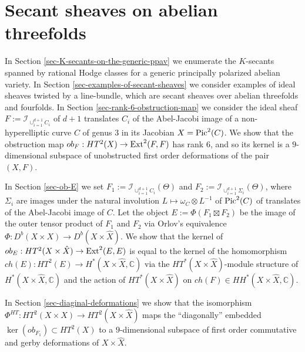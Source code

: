 \documentclass[12pt]{amsart}
\numberwithin{equation}{subsection}
\theoremstyle{plain}
\theoremstyle{definition}
\newcommand{\CC}{{\mathbb C}}
\newcommand{\Pic}{{\rm Pic}}
\newcommand{\Ext}{{\rm Ext}}
\newcommand{\Ideal}[1]{{\mathcal I}_{#1}}
\begin{document}
% 
\section{Secant sheaves on abelian threefolds}
\label{section-secant-sheaves-on-abelian-threefolds}
In Section \ref{sec-K-secants-on-the-generic-ppav} we enumerate the $K$-secants spanned by rational Hodge classes for a generic principally polarized abelian variety.
In Section \ref{sec-examples-of-secant-sheaves} we consider examples of ideal sheaves twisted by a line-bundle, which are secant sheaves over abelian threefolds and fourfolds.
In Section \ref{sec-rank-6-obstruction-map} we consider the ideal sheaf $F:=\Ideal{\cup_{i=1}^{d+1}C_i}$ of $d+1$ translates $C_i$ of the Abel-Jacobi 
image of a non-hyperelliptic curve $C$ of genus $3$ in its Jacobian $X=\Pic^2(C)$. We show that the obstruction map
$ob_F:HT^2(X)\rightarrow \Ext^2(F,F)$ has rank $6$, and so its kernel is a $9$-dimensional subspace of unobstructed first order deformations of the pair $(X,F)$.

In Section \ref{sec-ob-E} we set $F_1:=\Ideal{\cup_{i=1}^{d+1}C_i}(\Theta)$ and $F_2:=\Ideal{\cup_{i=1}^{d+1}\Sigma_i}(\Theta)$,
where $\Sigma_i$ are images under the natural involution $L\mapsto \omega_C\otimes L^{-1}$ of $\Pic^2(C)$ of translates of the Abel-Jacobi image of $C$.
Let the object $E:=\Phi(F_1\boxtimes F_2)$ be the image of the outer tensor product of $F_1$ and $F_2$ via Orlov's
equivalence $\Phi:D^b(X\times X)\rightarrow D^b(X\times\hat{X})$. We show that the kernel of
$ob_E:HT^2(X\times\hat{X})\rightarrow \Ext^2(E,E)$ is equal to the kernel of the homomorphism $ch(E):HT^2(E)\rightarrow H^*(X\times\hat{X},\CC)$
via the $HT^*(X\times\hat{X})$-module structure of $H^*(X\times\hat{X},\CC)$ and the action of $HT^*(X\times\hat{X})$ on $ch(F)\in HH^*(X\times\hat{X},\CC)$.

In Section \ref{sec-diaginal-deformations} we show that the isomorphism $\Phi^{HT}:HT^2(X\times X)\rightarrow HT^2(X\times\hat{X})$
maps the ``diagonally'' embedded $\ker(ob_{F_1})\subset HT^2(X)$ to a $9$-dimensional subspace of first order commutative and gerby deformations of $X\times\hat{X}$. 

% 
\end{document}
